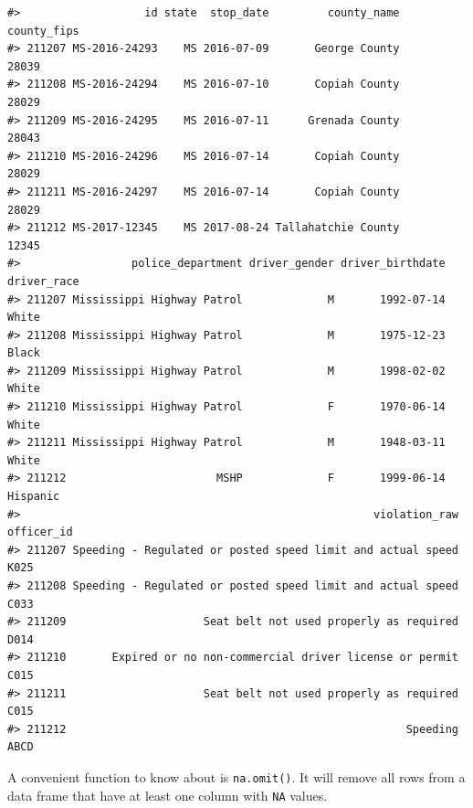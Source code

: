 \documentclass[
]{book}
\begin{document}
\begin{verbatim}
#>                   id state  stop_date         county_name county_fips
#> 211207 MS-2016-24293    MS 2016-07-09       George County       28039
#> 211208 MS-2016-24294    MS 2016-07-10       Copiah County       28029
#> 211209 MS-2016-24295    MS 2016-07-11      Grenada County       28043
#> 211210 MS-2016-24296    MS 2016-07-14       Copiah County       28029
#> 211211 MS-2016-24297    MS 2016-07-14       Copiah County       28029
#> 211212 MS-2017-12345    MS 2017-08-24 Tallahatchie County       12345
#>                 police_department driver_gender driver_birthdate driver_race
#> 211207 Mississippi Highway Patrol             M       1992-07-14       White
#> 211208 Mississippi Highway Patrol             M       1975-12-23       Black
#> 211209 Mississippi Highway Patrol             M       1998-02-02       White
#> 211210 Mississippi Highway Patrol             F       1970-06-14       White
#> 211211 Mississippi Highway Patrol             M       1948-03-11       White
#> 211212                       MSHP             F       1999-06-14    Hispanic
#>                                                      violation_raw officer_id
#> 211207 Speeding - Regulated or posted speed limit and actual speed       K025
#> 211208 Speeding - Regulated or posted speed limit and actual speed       C033
#> 211209                     Seat belt not used properly as required       D014
#> 211210       Expired or no non-commercial driver license or permit       C015
#> 211211                     Seat belt not used properly as required       C015
#> 211212                                                    Speeding       ABCD
\end{verbatim}

A convenient function to know about is \texttt{na.omit()}. It will remove all rows from a data frame that have at least one column with \texttt{NA} values.
\end{document}
